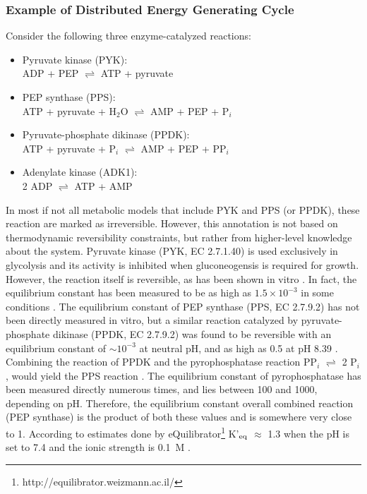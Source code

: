 \documentclass[twocolumn]{bmcart}%
\begin{document}
\subsubsection*{Example of Distributed Energy Generating Cycle}
Consider the following three enzyme-catalyzed reactions:
\begin{itemize}
	\item Pyruvate kinase (PYK):\\ADP + PEP $\rightleftharpoons$ ATP + pyruvate
	\item PEP synthase (PPS):\\ATP + pyruvate + H$_2$O $\rightleftharpoons$ AMP + PEP + P$_i$
	\item Pyruvate-phosphate dikinase (PPDK):\\ATP + pyruvate + P$_i$ $\rightleftharpoons$ AMP + PEP + PP$_i$
	\item Adenylate kinase (ADK1):\\2 ADP $\rightleftharpoons$ ATP + AMP
\end{itemize}
In most if not all metabolic models that include PYK and PPS (or PPDK), these reaction are marked as irreversible. However, this annotation is not based on thermodynamic reversibility constraints, but rather from higher-level knowledge about the system. Pyruvate kinase (PYK, EC 2.7.1.40) is used exclusively in glycolysis and its activity is inhibited when gluconeogensis is required for growth. However, the reaction itself is reversible, as has been shown in vitro \cite{Lardy1945-ze}. In fact, the equilibrium constant has been measured to be as high as $1.5 \times 10^{-3}$ in some conditions \cite{Krimsky1959-mt}. The equilibrium constant of PEP synthase (PPS, EC 2.7.9.2) has not been directly measured in vitro, but a similar reaction catalyzed by pyruvate-phosphate dikinase (PPDK, EC 2.7.9.2) was found to be reversible with an equilibrium constant of $\sim10^{-3}$ at neutral pH, and as high as 0.5 at pH 8.39 \cite{Reeves1968-mq}. Combining the reaction of PPDK and the pyrophosphatase reaction PP$_i$ $\rightleftharpoons$ 2 P$_i$, would yield the PPS reaction \cite{De_Meis1982-pe}. The equilibrium constant of pyrophosphatase has been measured directly numerous times, and lies between 100 and 1000, depending on pH. Therefore, the equilibrium constant overall combined reaction (PEP synthase) is the product of both these values and is somewhere very close to 1. According to estimates done by eQuilibrator\footnote{http://equilibrator.weizmann.ac.il/} K'$_{\rm eq}$ $\approx$ 1.3 when the pH is set to 7.4 and the ionic strength is 0.1~M \cite{Flamholz2012-uu}.
\end{document}

